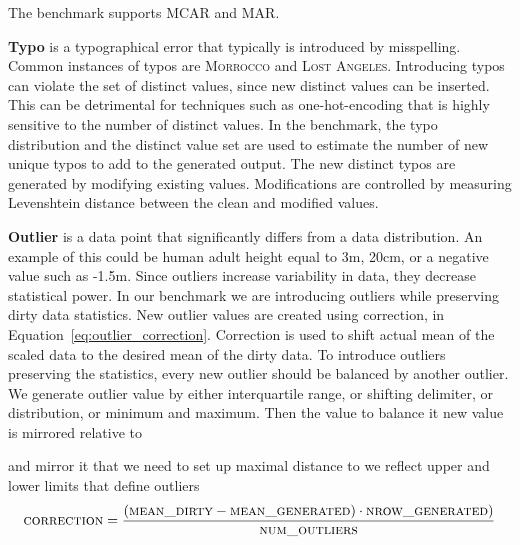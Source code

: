 The benchmark supports MCAR and MAR. 


\textbf{Typo} is a typographical error that typically is introduced by misspelling. 
Common instances of typos are \textsc{Morrocco} and \textsc{Lost Angeles}. 
Introducing typos can violate the set of distinct values, since new distinct values can be inserted.
This can be detrimental for techniques such as one-hot-encoding that is highly sensitive to the number of distinct values.
In the benchmark, the typo distribution and the distinct value set are used to estimate the number of new unique typos to add to the generated output. 
The new distinct typos are generated by modifying existing values. Modifications are controlled by measuring Levenshtein distance between the clean and modified values. 


\textbf{Outlier} is a data point that significantly differs from a data distribution.
An example of this could be human adult height equal to 3m, 20cm, or a negative value such as -1.5m. 
Since outliers increase variability in data, they decrease statistical power.
In our benchmark we are introducing outliers while preserving dirty data statistics. 
New outlier values are created using correction, in Equation~\ref{eq:outlier_correction}. 
Correction is used to shift actual mean of the scaled data to the desired mean of the dirty data. 
To introduce outliers preserving the statistics, every new outlier should be balanced by another outlier. 
We generate outlier value by either interquartile range, or shifting delimiter, or distribution, or minimum and maximum. Then the value to balance it new value is mirrored relative to 

and mirror it  that
we need to set up maximal distance to we reflect upper and lower limits that define outliers  
\begin{equation}
\label{eq:outlier_correction}
\textsc{correction} = \frac{(\textsc{mean\_dirty} - \textsc{mean\_generated}) \cdot \textsc{nrow\_generated})}{\textsc{num\_outliers}}
\end{equation}



